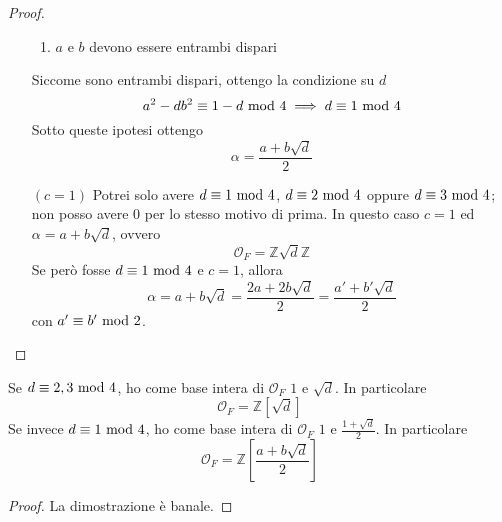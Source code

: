 \begin{proof}
\begin{itemize}
\begin{enumerate}
			\item $a$ e $b$ devono essere entrambi dispari
		\end{enumerate}
		Siccome sono entrambi dispari, ottengo la condizione su $d$ 
		\begin{equation*}
		a^2-db^2\equiv1-d\ \mathrm{mod}\ 4 \implies d\equiv1\ \mathrm{mod}\ 4
		\end{equation*}
		Sotto queste ipotesi ottengo 
		\begin{equation*}
		\alpha=\frac{a+b\sqrt{d}}{2}
		\end{equation*}
		\item[$(c=1)$] Potrei solo avere $d\equiv1\ \mathrm{mod}\ 4$, $d\equiv2\ \mathrm{mod}\ 4$ oppure $d\equiv3\ \mathrm{mod}\ 4$; non posso avere 0 per lo stesso motivo di prima. In questo caso $c=1$ ed $\alpha=a+b\sqrt{d}$, ovvero
		\begin{equation*}
		\mathcal{O}_F=\mathbb{Z}\sqrt{d}\mathbb{Z}
		\end{equation*}
		Se però fosse $d\equiv1\ \mathrm{mod}\ 4$ e $c=1$, allora 
		\begin{equation*}
		\alpha=a+b\sqrt{d}=\frac{2a+2b\sqrt{d}}{2}=\frac{a'+b'\sqrt{d}}{2}
		\end{equation*}
		con $a'\equiv b'\ \mathrm{mod}\ 2$.
	\end{itemize}
\end{proof}
\begin{corollario}
	Se $d\equiv2,3\ \mathrm{mod}\ 4$, ho come base intera di $\mathcal{O}_F$ $1$ e $\sqrt{d}$. In particolare 
	\begin{equation*}
	\mathcal{O}_F=\mathbb{Z}[\sqrt{d}]
	\end{equation*}
	Se invece $d\equiv1\ \mathrm{mod}\ 4$, ho come base intera di $\mathcal{O}_F$ $1$ e $\frac{1+\sqrt{d}}{2}$. In particolare
	\begin{equation*}
		\mathcal{O}_F=\mathbb{Z}\left[\frac{a+b\sqrt{d}}{2}\right]
	\end{equation*}
\end{corollario}
\begin{proof}
	La dimostrazione è banale.
\end{proof}




